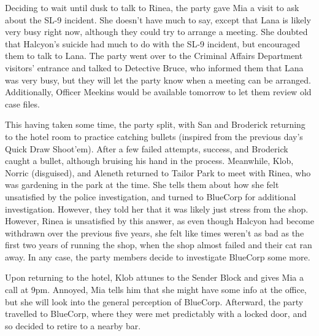 Deciding to wait until dusk to talk to Rinea, the party gave Mia a visit to ask about the SL-9 incident. She doesn't have much to say, except that Lana is likely very busy right now, although they could try to arrange a meeting. She doubted that Halcyon's suicide had much to do with the SL-9 incident, but encouraged them to talk to Lana. The party went over to the Criminal Affairs Department visitors' entrance and talked to Detective Bruce, who informed them that Lana was very busy, but they will let the party know when a meeting can be arranged. Additionally, Officer Meekins would be available tomorrow to let them review old case files.

This having taken some time, the party split, with San and Broderick returning to the hotel room to practice catching bullets (inspired from the previous day's Quick Draw Shoot'em). After a few failed attempts, success, and Broderick caught a bullet, although bruising his hand in the process. Meanwhile, Klob, Norric (disguised), and Aleneth returned to Tailor Park to meet with Rinea, who was gardening in the park at the time. She tells them about how she felt unsatisfied by the police investigation, and turned to BlueCorp for additional investigation. However, they told her that it was likely just stress from the shop. However, Rinea is unsatisfied by this answer, as even though Halcyon had become withdrawn over the previous five years, she felt like times weren't as bad as the first two years of running the shop, when the shop almost failed and their cat ran away. In any case, the party members decide to investigate BlueCorp some more. 

Upon returning to the hotel, Klob attunes to the Sender Block and gives Mia a call at 9pm. Annoyed, Mia tells him that she might have some info at the office, but she will look into the general perception of BlueCorp. Afterward, the party travelled to BlueCorp, where they were met predictably with a locked door, and so decided to retire to a nearby bar.